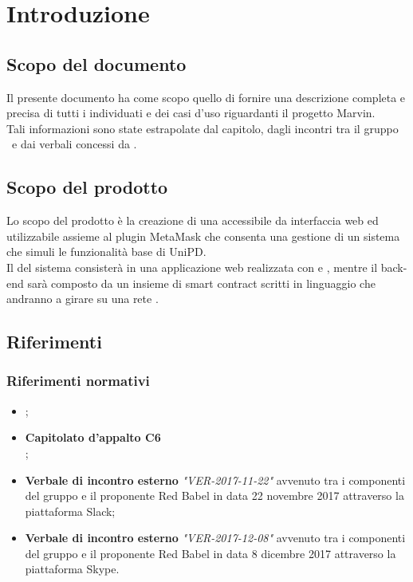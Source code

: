 \documentclass[AnalisiDeiRequisiti.tex]{subfiles}
\begin{document}
\chapter{Introduzione}
\section{Scopo del documento}
Il presente documento ha come scopo quello di fornire una descrizione completa e precisa di tutti i  individuati e dei casi d'uso riguardanti il progetto Marvin.\\
Tali informazioni sono state estrapolate dal capitolo, dagli incontri tra il gruppo \gruppo\ e dai verbali concessi da \Proponente.

\section{Scopo del prodotto}
Lo scopo del prodotto è la creazione di una  accessibile da interfaccia web ed utilizzabile assieme al plugin MetaMask che consenta una gestione di un sistema che simuli le funzionalità base di UniPD.\\
Il  del sistema consisterà in una applicazione web realizzata con  e , mentre il back-end sarà composto da un insieme di smart contract scritti in linguaggio  che andranno a girare su una rete .

\glossExpl

\section{Riferimenti}

\subsection{Riferimenti normativi}

\begin{itemize}
	\item \textbf{\ndp \vruno};
	\item \textbf{Capitolato d'appalto C6}\\ ;
	\item \textbf{Verbale di incontro esterno} \textit{"VER-2017-11-22"} avvenuto tra i componenti del gruppo e il proponente Red Babel in data 22 novembre 2017 attraverso la piattaforma Slack;
	\item \textbf{Verbale di incontro esterno} \textit{"VER-2017-12-08"} avvenuto tra i componenti del gruppo e il proponente Red Babel in data 8 dicembre 2017 attraverso la piattaforma Skype.
\end{itemize}
\end{document}

